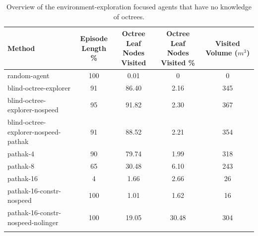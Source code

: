 \begin{longtable}{|l|c|c|c|c|}                            \hline
    \textbf{Method}            
    & \theadcentered{Episode \\ Length \%}          
    & \theadcentered{Octree Leaf \\ Nodes Visited} 
    & \theadcentered{Octree Leaf \\ Nodes Visited \%} 
    & \theadcentered{Visited  \\ Volume  ($m^3$)} 

    \\ \hline
    random-agent	&	100	& 0.01 & 0	& {\cellcolor[HTML]{EBF2F0}} \color[HTML]{000000}	0	\\ \hline
    blind-octree-explorer & 91 & 86.40 & 2.16 & {\cellcolor[HTML]{77BAAD}} \color[HTML]{000000} 345 \\ \hline
    blind-octree-explorer-nospeed & 95 & 91.82 & 2.30 & {\cellcolor[HTML]{55AA99}} \color[HTML]{000000} 367 \\ \hline
    blind-octree-explorer-nospeed-pathak & 91 & 88.52 & 2.21 & {\cellcolor[HTML]{6AB4A5}} \color[HTML]{000000} 354 \\ \hline
    
    pathak-4 & 90 & 79.74 & 1.99 & {\cellcolor[HTML]{A1CFC5}} \color[HTML]{000000} 318 \\ \hline
    pathak-8 & {\cellcolor[HTML]{EBF2F0}} \color[HTML]{000000} 65 & 30.48 & 6.10 & {\cellcolor[HTML]{EBF2F0}} \color[HTML]{000000} 243 \\ \hline
    pathak-16 & {\cellcolor[HTML]{EBF2F0}} \color[HTML]{000000} 4 & 1.66 & 2.66 & {\cellcolor[HTML]{EBF2F0}} \color[HTML]{000000} 26 \\ \hline
    pathak-16-constr-nospeed & 100 & 1.01 & 1.62 & {\cellcolor[HTML]{EBF2F0}} \color[HTML]{000000} 16 \\ \hline
    pathak-16-constr-nospeed-nolinger & 100 & 19.05 & 30.48 & {\cellcolor[HTML]{B7D9D2}} \color[HTML]{000000} 304 \\ \hline
    
    \caption{Overview of the environment-exploration focused agents that have no knowledge of octrees. 
    }
    \label{tab:RQ2-results-noknowledgeofOctrees}
\end{longtable}



